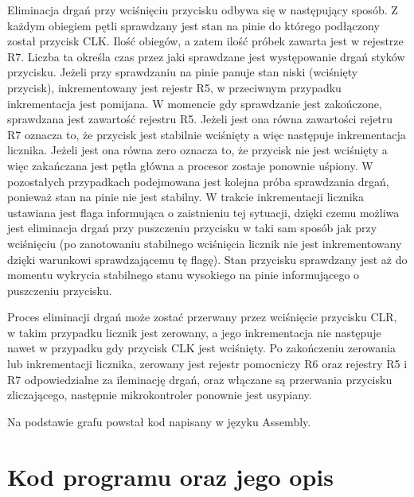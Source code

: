\documentclass[fleqn]{article}
\begin{document}
Eliminacja drgań przy wciśnięciu przycisku odbywa się w następujący sposób. Z każdym obiegiem pętli sprawdzany jest stan na pinie do którego podłączony został przycisk CLK. Ilość obiegów, a zatem ilość próbek zawarta jest w rejestrze R7. Liczba ta określa czas przez jaki sprawdzane jest występowanie drgań styków przycisku. Jeżeli przy sprawdzaniu na pinie panuje stan niski (wciśnięty przycisk), inkrementowany jest rejestr R5, w przeciwnym przypadku inkrementacja jest pomijana. W momencie gdy sprawdzanie jest zakończone, sprawdzana jest zawartość rejestru R5. Jeżeli jest ona równa zawartości rejetru R7 oznacza to, że przycisk jest stabilnie wciśnięty a więc następuje inkrementacja licznika. Jeżeli jest ona równa zero oznacza to, że przycisk nie jest wciśnięty a więc zakańczana jest pętla główna a procesor zostaje ponownie uśpiony. W pozostałych przypadkach podejmowana jest kolejna próba sprawdzania drgań, ponieważ stan na pinie nie jest stabilny. W trakcie inkrementacji licznika ustawiana jest flaga informująca o zaistnieniu tej sytuacji, dzięki czemu możliwa jest eliminacja drgań przy puszczeniu przycisku w taki sam sposób jak przy wciśnięciu (po zanotowaniu stabilnego wciśnięcia licznik nie jest inkrementowany dzięki warunkowi sprawdzającemu tę flagę). Stan przycisku sprawdzany jest aż do momentu wykrycia stabilnego stanu wysokiego na pinie informującego o puszczeniu przycisku.  

Proces eliminacji drgań może zostać przerwany przez wciśnięcie przycisku CLR, w takim przypadku licznik jest zerowany, a jego inkrementacja nie następuje nawet w przypadku gdy przycisk CLK jest wciśnięty. Po zakończeniu zerowania lub inkrementacji licznika, zerowany jest rejestr pomocniczy R6 oraz rejestry R5 i R7 odpowiedzialne za ileminację drgań, oraz włączane są przerwania przycisku zliczającego, następnie mikrokontroler ponownie jest usypiany.

Na podstawie grafu powstał kod napisany w języku Assembly.



\section{Kod programu oraz jego opis}
\end{document}
